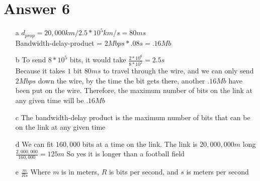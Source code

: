 \documentclass[11pt]{article}
\theoremstyle{definition}
\begin{document}
\section*{Answer 6}
\begin{enumerate}
	\item[a]
	$d_{prop} = 20,000km / 2.5*10^5km/s = 80ms$\\
	Bandwidth-delay-product = $2Mbps * .08s = .16Mb$\\

	\item[b]
	To send $8 * 10^5$ bits, it would take $\frac{2 * 10^6}{8 * 10^5} = 2.5s$\\
	Because it takes $1$ bit $80ms$ to travel through the wire, and we can only send $2Mbps$ down the wire, by the time the bit gets there, another $.16Mb$ have been put on the wire.  Therefore, the maximum number of bits on the link at any given time will be $.16Mb$\\

	\item[c]
	The bandwidth-delay product is the maximum number of bits that can be on the link at any given time

	\item[d]
	We can fit $160,000$ bits at a time on the link.  The link is $20,000,000m$ long\\
	$\frac{2,000,000}{160,000} = 125m$  So yes it is longer than a football field\\

	\item[e]
	$\frac{m}{Rs}$ Where $m$ is in meters, $R$ is bits per second, and $s$ is meters per second
\end{enumerate}
\end{document}
